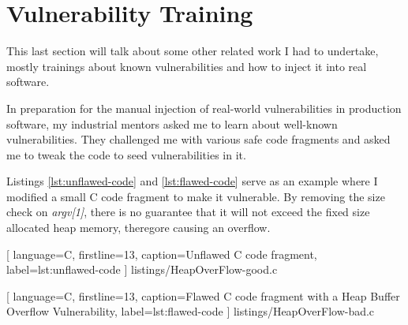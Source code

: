 \section{Vulnerability Training}

This last section will talk about some other related work I had to undertake, mostly trainings about known vulnerabilities and how to inject it into real software.

In preparation for the manual injection of real-world vulnerabilities in production software, my industrial mentors asked me to learn about well-known vulnerabilities. They challenged me with various safe code fragments and asked me to tweak the code to seed vulnerabilities in it.

Listings \ref{lst:unflawed-code} and \ref{lst:flawed-code} serve as an example where I modified a small C code fragment to make it vulnerable. By removing the size check on \emph{argv[1]}, there is no guarantee that it will not exceed the fixed size allocated heap memory, theregore causing an overflow. 

\clearpage


    [
        language=C,
        firstline=13,
        caption=Unflawed C code fragment,
        label=lst:unflawed-code
    ]
    {listings/HeapOverFlow-good.c}
    
\vspace{2cm}
    

    [
        language=C,
        firstline=13,
        caption=Flawed C code fragment with a Heap Buffer Overflow Vulnerability,
        label=lst:flawed-code
    ]
    {listings/HeapOverFlow-bad.c}
